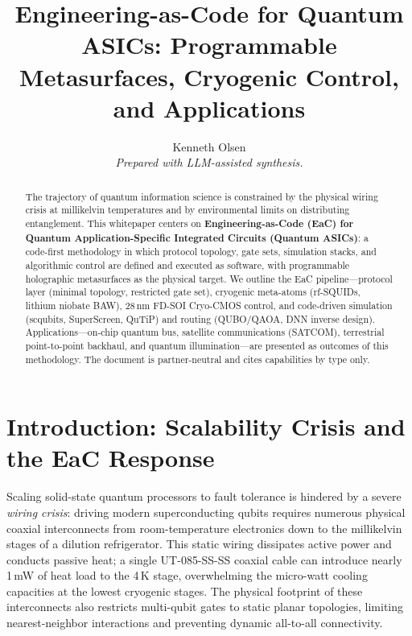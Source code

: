 \documentclass[11pt, a4paper]{article}
\begin{document}
\title{\textbf{Engineering-as-Code for Quantum ASICs: Programmable Metasurfaces, Cryogenic Control, and Applications}}
\author{Kenneth Olsen\\ \small\textit{Prepared with LLM-assisted synthesis.}}
\date{}

\maketitle

\begin{abstract}
The trajectory of quantum information science is constrained by the physical wiring crisis at millikelvin temperatures and by environmental limits on distributing entanglement. This whitepaper centers on \textbf{Engineering-as-Code (EaC) for Quantum Application-Specific Integrated Circuits (Quantum ASICs)}: a code-first methodology in which protocol topology, gate sets, simulation stacks, and algorithmic control are defined and executed as software, with programmable holographic metasurfaces as the physical target. We outline the EaC pipeline---protocol layer (minimal topology, restricted gate set), cryogenic meta-atoms (rf-SQUIDs, lithium niobate BAW), 28\,nm FD-SOI Cryo-CMOS control, and code-driven simulation (scqubits, SuperScreen, QuTiP) and routing (QUBO/QAOA, DNN inverse design). Applications---on-chip quantum bus, satellite communications (SATCOM), terrestrial point-to-point backhaul, and quantum illumination---are presented as outcomes of this methodology. The document is partner-neutral and cites capabilities by type only.
\end{abstract}

\section{Introduction: Scalability Crisis and the EaC Response}

Scaling solid-state quantum processors to fault tolerance is hindered by a severe \emph{wiring crisis}: driving modern superconducting qubits requires numerous physical coaxial interconnects from room-temperature electronics down to the millikelvin stages of a dilution refrigerator\cite{ref1}. This static wiring dissipates active power and conducts passive heat; a single UT-085-SS-SS coaxial cable can introduce nearly 1\,mW of heat load to the 4\,K stage, overwhelming the micro-watt cooling capacities at the lowest cryogenic stages\cite{ref1}. The physical footprint of these interconnects also restricts multi-qubit gates to static planar topologies, limiting nearest-neighbor interactions and preventing dynamic all-to-all connectivity.
\end{document}
